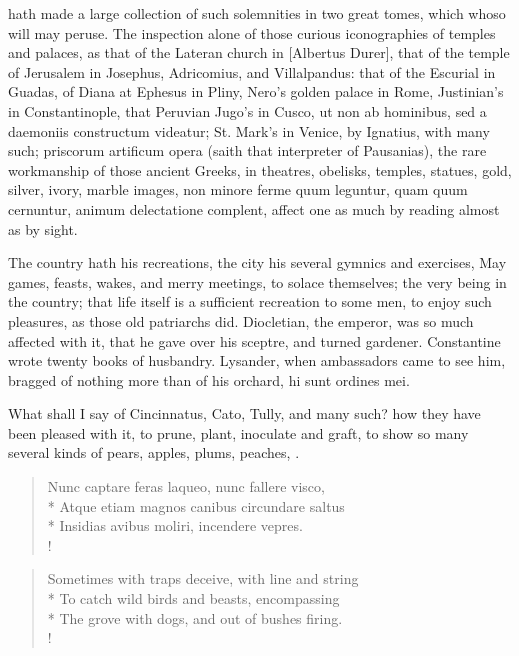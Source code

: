 {hath made a large collection of such solemnities in two great tomes,
which whoso will may peruse. The inspection alone of those curious
iconographies of temples and palaces, as that of the Lateran church in
[Albertus Durer], that of the temple of Jerusalem in Josephus,
Adricomius, and Villalpandus: that of the Escurial in Guadas, of Diana
at Ephesus in Pliny, Nero's golden palace in Rome, Justinian's in
Constantinople, that Peruvian Jugo's in Cusco, ut non ab
hominibus, sed a daemoniis constructum videatur; St. Mark's in Venice,
by Ignatius, with many such; priscorum artificum opera (saith that
interpreter of Pausanias), the rare workmanship of those ancient
Greeks, in theatres, obelisks, temples, statues, gold, silver, ivory,
marble images, non minore ferme quum leguntur, quam quum cernuntur,
animum delectatione complent, affect one as much by reading almost as
by sight.

The country hath his recreations, the city his several gymnics and
exercises, May games, feasts, wakes, and merry meetings, to solace
themselves; the very being in the country; that life itself is a
sufficient recreation to some men, to enjoy such pleasures, as those
old patriarchs did. Diocletian, the emperor, was so much affected with
it, that he gave over his sceptre, and turned gardener. Constantine
wrote twenty books of husbandry. Lysander, when ambassadors came to see
him, bragged of nothing more than of his orchard, hi sunt ordines mei.

What shall I say of Cincinnatus, Cato, Tully, and many such? how they
have been pleased with it, to prune, plant, inoculate and graft, to
show so many several kinds of pears, apples, plums, peaches, \etc{}.
%
%
\begin{latin}%
\begin{verse}%
Nunc captare feras laqueo, nunc fallere visco,\\*
Atque etiam magnos canibus circundare saltus\\*
Insidias avibus moliri, incendere vepres.\\!
\end{verse}%
\end{latin}%
\translationrule%
\begin{verse}%
Sometimes with traps deceive, with line and string\\*
To catch wild birds and beasts, encompassing\\*
The grove with dogs, and out of bushes firing.\\!
\end{verse}%

}
